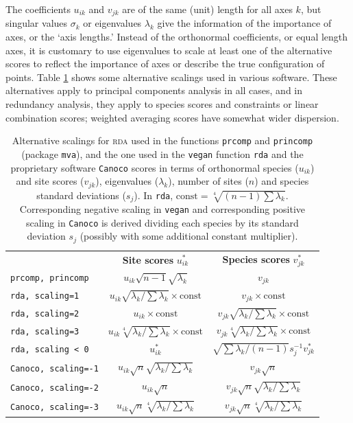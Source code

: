 \documentclass[a4paper]{article}
\begin{document}
The coefficients $u_{ik}$ and $v_{jk}$ are of the same (unit) length
for all axes $k$, but singular values $\sigma_k$ or eigenvalues
$\lambda_k$ give the information of the importance of axes, or the
`axis lengths.'  Instead of the orthonormal coefficients, or equal
length axes, it is customary to use eigenvalues to scale at least one
of the alternative scores to reflect the importance of axes or
describe the true configuration of points.  Table \ref{tab:scales}
shows some alternative scalings used in various software.  These
alternatives apply to principal components analysis in all cases, and
in redundancy analysis, they apply to species scores and constraints or
linear combination scores; weighted averaging scores have somewhat
wider dispersion.

\begin{table}
  \caption{\label{tab:scales} Alternative scalings for \textsc{rda} used
    in the functions \texttt{prcomp} and \texttt{princomp} (package
    \texttt{mva}), and the one used in the \texttt{vegan} function \texttt{rda}
    and the proprietary software \texttt{Canoco}
    scores in terms of orthonormal species ($u_{ik}$) and site scores
    ($v_{jk}$), eigenvalues ($\lambda_k$), number of sites  ($n$) and
    species standard deviations ($s_j$). In \texttt{rda}, 
    $\mathrm{const} = \sqrt[4]{(n-1) \sum \lambda_k}$.  Corresponding
    negative scaling in \texttt{vegan} 
    and corresponding positive scaling in \texttt{Canoco} is derived
    dividing each  species by its standard deviation $s_j$ (possibly
    with some additional constant multiplier).  } 
\begin{tabular}{lcc}
& \textbf{Site scores} $u_{ik}^*$ & 
\textbf{Species scores} $v_{jk}^*$ \\
\texttt{prcomp, princomp} & 
$u_{ik} \sqrt{n-1} \sqrt{\lambda_k}$ &
$v_{jk}$ \\
\texttt{rda, scaling=1} &
$u_{ik} \sqrt{\lambda_k/ \sum \lambda_k} \times \mathrm{const}$ &
$v_{jk} \times \mathrm{const}$
\\
\texttt{rda, scaling=2} &
$u_{ik} \times \mathrm{const}$ &
$v_{jk} \sqrt{\lambda_k/ \sum \lambda_k} \times \mathrm{const}$  \\
\texttt{rda, scaling=3} &
$u_{ik} \sqrt[4]{\lambda_k/ \sum \lambda_k} \times \mathrm{const}$ &
$v_{jk} \sqrt[4]{\lambda_k/ \sum \lambda_k} \times \mathrm{const}$ \\
\texttt{rda, scaling < 0} &
$u_{ik}^*$ &
$\sqrt{\sum \lambda_k /(n-1)} s_j^{-1} v_{jk}^*$
\\
\texttt{Canoco, scaling=-1} &
$u_{ik} \sqrt{n} \sqrt{\lambda_k / \sum \lambda_k}$ &
$v_{jk} \sqrt{n}$ \\
\texttt{Canoco, scaling=-2} &
$u_{ik} \sqrt{n}$ &
$v_{jk} \sqrt{n} \sqrt{\lambda_k / \sum \lambda_k}$ 
\\
\texttt{Canoco, scaling=-3} &
$u_{ik} \sqrt{n} \sqrt[4]{\lambda_k / \sum \lambda_k}$ &
$v_{jk} \sqrt{n} \sqrt[4]{\lambda_k / \sum \lambda_k}$ 
\end{tabular} 
\end{table}
\end{document}
